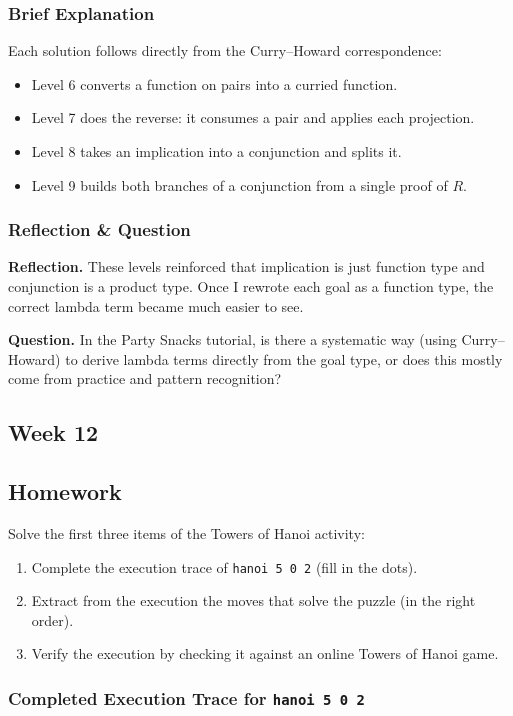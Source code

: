 \documentclass{article}
\theoremstyle{theorem}
\theoremstyle{definition}
\theoremstyle{remark}
\begin{document}
\subsubsection*{Brief Explanation}
Each solution follows directly from the Curry–Howard correspondence:
\begin{itemize}
  \item Level 6 converts a function on pairs into a curried function.
  \item Level 7 does the reverse: it consumes a pair and applies each projection.
  \item Level 8 takes an implication into a conjunction and splits it.
  \item Level 9 builds both branches of a conjunction from a single proof of \(R\).
\end{itemize}

\subsubsection*{Reflection \& Question}
\textbf{Reflection.}  
These levels reinforced that implication is just function type and conjunction is a product type. Once I rewrote each goal as a function type, the correct lambda term became much easier to see.

\textbf{Question.}  
In the Party Snacks tutorial, is there a systematic way (using Curry–Howard) to derive lambda terms directly from the goal type, or does this mostly come from practice and pattern recognition?

\subsection{Week 12}\label{sec:week12}
\smallskip
\subsection*{Homework}
Solve the first three items of the Towers of Hanoi activity:
\begin{enumerate}
  \item Complete the execution trace of \texttt{hanoi 5 0 2} (fill in the dots).
  \item Extract from the execution the moves that solve the puzzle (in the right order).
  \item Verify the execution by checking it against an online Towers of Hanoi game.
\end{enumerate}

\subsubsection*{Completed Execution Trace for \texttt{hanoi 5 0 2}}
\end{document}
